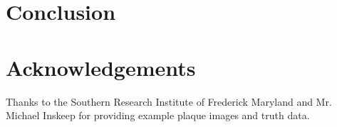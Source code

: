 \documentclass[11pt,final,twocolumn]{IEEEtran}
\begin{document}
\section{Conclusion}\label{sec:conclusion}





\section*{Acknowledgements}
Thanks to the Southern Research Institute of Frederick Maryland and Mr. Michael Inskeep for providing example plaque images and truth data.
\end{document}
